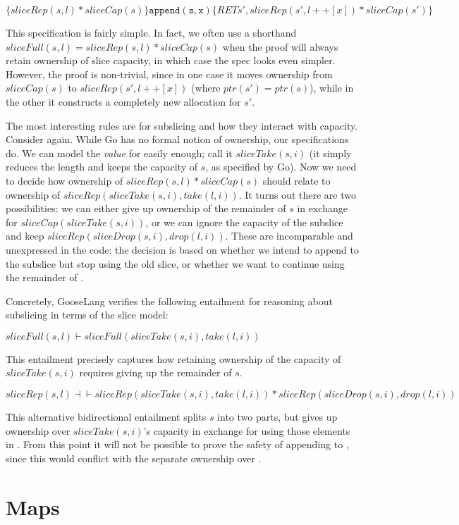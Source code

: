 $\{sliceRep(s, l) * sliceCap(s)\} \mathtt{append(s, x)} \{RET s', sliceRep(s', l ++ [x]) * sliceCap(s')\}$

This specification is fairly simple. In fact, we often use a shorthand
$sliceFull(s, l) = sliceRep(s, l) * sliceCap(s)$ when the proof will
always retain ownership of slice capacity, in which case the spec looks
even simpler. However, the proof is non-trivial, since in one case it
moves ownership from $sliceCap(s)$ to $sliceRep(s', l ++ [x])$
(where $ptr(s') = ptr(s)$), while in the other it constructs a
completely new allocation for $s'$.

The most interesting rules are for subslicing and how they interact with
capacity. Consider  again. While Go has no formal
notion of ownership, our specifications do. We can model the
\emph{value} for  easily enough; call it
$sliceTake(s, i)$ (it simply reduces the length and keeps the capacity
of $s$, as specified by Go). Now we need to decide how ownership of
$sliceRep(s, l) * sliceCap(s)$ should relate to ownership of
$sliceRep(sliceTake(s, i), take(l, i))$. It turns out there are two
possibilities: we can either give up ownership of the remainder of $s$
in exchange for $sliceCap(sliceTake(s, i))$, or we can ignore the
capacity of the subslice and keep
$sliceRep(sliceDrop(s, i), drop(l, i))$. These are incomparable and
unexpressed in the code: the decision is based on whether we intend to
append to the subslice but stop using the old slice, or whether we want
to continue using the remainder of .

Concretely, GooseLang verifies the following entailment for reasoning
about subslicing in terms of the slice model:

$sliceFull(s, l) \vdash sliceFull(sliceTake(s, i), take(l, i))$

This entailment precisely captures how retaining ownership of the
capacity of $sliceTake(s, i)$ requires giving up the remainder of
$s$.

$sliceRep(s, l) \dashv\vdash sliceRep(sliceTake(s, i), take(l, i)) * sliceRep(sliceDrop(s, i), drop(l, i))$

This alternative bidirectional entailment splits $s$ into two parts,
but gives up ownership over $sliceTake(s, i)$'s capacity in exchange
for using those elements in . From this point it will
not be possible to prove the safety of appending to ,
since this would conflict with the separate ownership over
.

\section{Maps}

